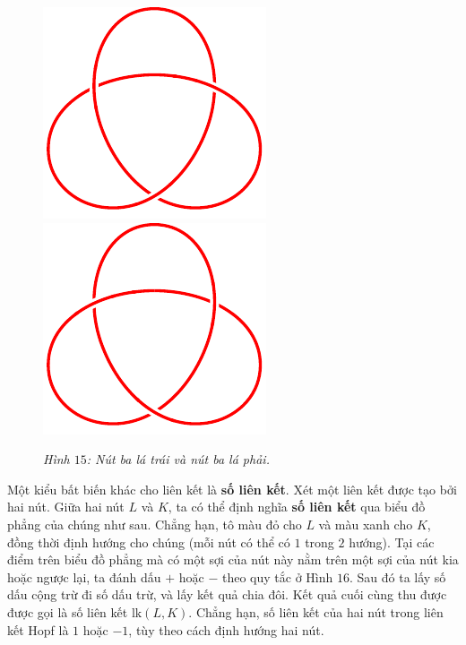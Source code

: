 \begin{multicols}{2}
	\begin{figure}[H]
		\vspace*{-5pt}
		\centering
		\captionsetup{labelformat= empty, justification=centering}
		\includegraphics[width= 0.38\linewidth]{trefoil.pdf}\quad\quad
		\includegraphics[width= 0.38\linewidth]{mirror trefoil.pdf}
		\caption{\small\textit{\color{duongvaotoanhoc}Hình $15$: Nút ba lá trái và nút ba lá phải.}}
		\vspace*{-10pt}
	\end{figure}
	Một kiểu bất biến khác cho liên kết là {\bf\color{duongvaotoanhoc} số liên kết}. Xét một liên kết được tạo bởi hai nút. Giữa hai nút $L$ và $K$, ta có thể định nghĩa {\bf\color{duongvaotoanhoc} số liên kết} qua biểu đồ phẳng của chúng như sau. Chẳng hạn, tô màu đỏ cho $L$ và màu xanh cho $K$, đồng thời định hướng cho chúng (mỗi nút có thể có $1$ trong $2$ hướng). Tại các điểm trên biểu đồ phẳng mà có một sợi của nút này nằm trên một sợi của nút kia hoặc ngược lại, ta đánh dấu $+$ hoặc $-$ theo quy tắc ở Hình $16$. Sau đó ta lấy số dấu cộng trừ đi số dấu trừ, và lấy kết quả chia đôi. Kết quả cuối cùng thu được được gọi là số liên kết $\text{lk}(L,K)$. Chẳng hạn, số liên kết của hai nút trong liên kết Hopf là $1$ hoặc $-1$, tùy theo cách định hướng hai nút.
	\begin{figure}[H]
		\vspace*{-5pt}
		\centering
		\captionsetup{labelformat= empty, justification=centering}

\end{figure}
\end{multicols}
